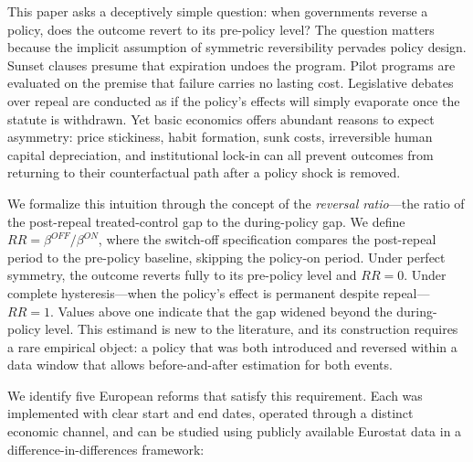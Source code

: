 \documentclass[12pt]{article}
\begin{document}
This paper asks a deceptively simple question: when governments reverse a policy, does the outcome revert to its pre-policy level? The question matters because the implicit assumption of symmetric reversibility pervades policy design. Sunset clauses presume that expiration undoes the program. Pilot programs are evaluated on the premise that failure carries no lasting cost. Legislative debates over repeal are conducted as if the policy's effects will simply evaporate once the statute is withdrawn. Yet basic economics offers abundant reasons to expect asymmetry: price stickiness, habit formation, sunk costs, irreversible human capital depreciation, and institutional lock-in can all prevent outcomes from returning to their counterfactual path after a policy shock is removed.

We formalize this intuition through the concept of the \textit{reversal ratio}---the ratio of the post-repeal treated-control gap to the during-policy gap. We define $RR = \beta^{OFF}/\beta^{ON}$, where the switch-off specification compares the post-repeal period to the pre-policy baseline, skipping the policy-on period. Under perfect symmetry, the outcome reverts fully to its pre-policy level and $RR = 0$. Under complete hysteresis---when the policy's effect is permanent despite repeal---$RR = 1$. Values above one indicate that the gap widened beyond the during-policy level. This estimand is new to the literature, and its construction requires a rare empirical object: a policy that was both introduced and reversed within a data window that allows before-and-after estimation for both events.

We identify five European reforms that satisfy this requirement. Each was implemented with clear start and end dates, operated through a distinct economic channel, and can be studied using publicly available Eurostat data in a difference-in-differences framework:
\end{document}
